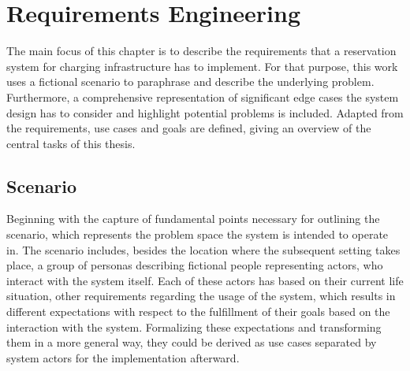 
\chapter{Requirements Engineering}
\label{ch:Requirements Engineering}

The main focus of this chapter is to describe the requirements that a reservation system for charging infrastructure has to implement.
For that purpose, this work uses a fictional scenario to paraphrase and describe the underlying problem. Furthermore, a comprehensive representation of significant edge cases the system design has to consider and highlight potential problems is included.
Adapted from the requirements, use cases and goals are defined, giving an overview of the central tasks of this thesis.

\section{Scenario}
\label{ch:Requirements Engineering:sec:Scenario}

Beginning with the capture of fundamental points necessary for outlining the scenario, which represents the problem space the system is intended to operate in.
The scenario includes, besides the location where the subsequent setting takes place, a group of personas describing fictional people representing actors, who interact with the system itself.
Each of these actors has based on their current life situation, other requirements regarding the usage of the system, which results in different expectations with respect to the fulfillment of their goals based on the interaction with the system.
Formalizing these expectations and transforming them in a more general way, they could be derived as use cases separated by system actors for the implementation afterward.

